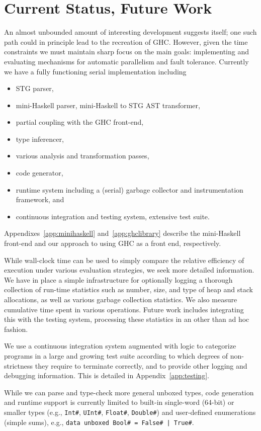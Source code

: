\documentclass{llncs}
\begin{document}
\section{Current Status, Future Work}

An almost unbounded amount of interesting development suggests itself; one
such path could in principle lead to the recreation of GHC\@.  However, given
the time constraints we must maintain sharp focus on the main goals:
implementing and evaluating mechanisms for automatic parallelism and fault
tolerance.  Currently we have a fully functioning serial implementation
including
\begin{itemize}
\item STG parser,
\item mini-Haskell parser, mini-Haskell to STG AST transformer,
\item partial coupling with the GHC front-end,
\item type inferencer,
\item various analysis and transformation passes,
\item code generator,
\item runtime system including a (serial) garbage collector and instrumentation framework, and
\item continuous integration and testing system, extensive test suite.
\end{itemize}
Appendixes~\ref{app:minihaskell} and~\ref{app:ghclibrary} describe the
mini-Haskell front-end and our approach to using GHC as a front end,
respectively.
%

While wall-clock time can be used to simply compare the relative efficiency of
execution under various evaluation strategies, we seek more detailed
information.  We have in place a simple infrastructure for optionally logging
a thorough collection of run-time statistics such as number, size, and type of
heap and stack allocations, as well as various garbage collection statistics.
We also measure cumulative time spent in various operations.  Future work
includes integrating this with the testing system, processing these statistics
in an other than ad hoc fashion.

We use a continuous integration system augmented with logic to categorize
programs in a large and growing test suite according to which degrees of
non-strictness they require to terminate correctly, and to provide other
logging and debugging information.  This is detailed in Appendix~\ref{app:testing}.

While we can parse and type-check more general unboxed types, code generation
and runtime support is currently limited to built-in single-word (64-bit) or
smaller types (e.g., \texttt{Int\#}, \texttt{UInt\#}, \texttt{Float\#},
\texttt{Double\#}) and user-defined enumerations (simple sums), e.g.,
\texttt{data unboxed Bool\# = False\# | True\#}.
\end{document}
